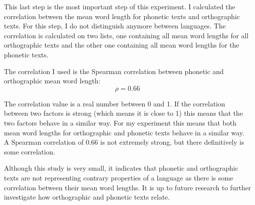 \begin{description}[style=unboxed]
\item[\textsc{4. step - Calculating correlation}] This last step is the most important step of this experiment. I calculated the correlation between the mean word length for phonetic texts and orthographic texts. For this step, I do not distinguish anymore between languages. The correlation is calculated on two lists, one containing all mean word lengths for all orthographic texts and the other one containing all mean word lengths for the phonetic texts.

The correlation I used is the Spearman correlation between phonetic and orthographic mean word length:
$$ \rho = 0.66$$

The correlation value is a real number between 0 and 1. If the correlation between two factors is strong (which means it is close to 1) this means that the two factors behave in a similar way. For my experiment this means that both mean word lengths for orthographic and phonetic texts behave in a similar way. A Spearman correlation of $0.66$ is not extremely strong, but there definitively is some correlation. 
\end{description}

Although this study is very small, it indicates that phonetic and orthographic texts are not representing contrary properties of a language as there is some correlation between their mean word lengths. It is up to future research to further investigate how orthographic and phonetic texts relate.








